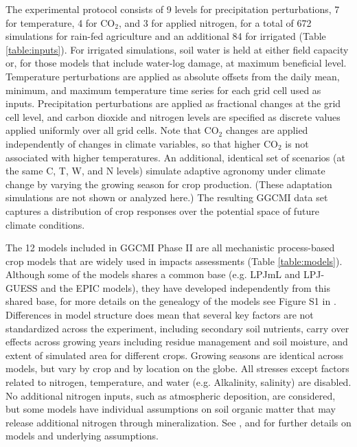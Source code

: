 \documentclass[preprint, 5p, times, twocolumn]{elsarticle}
\begin{document}
The experimental protocol consists of 9 levels for precipitation perturbations, 7 for temperature, 4 for CO$_2$, and 3 for applied nitrogen, for a total of 672 simulations for rain-fed agriculture and an additional 84 for irrigated (Table \ref{table:inputs}). For irrigated simulations, soil water is held at either field capacity or, for those models that include water-log damage, at maximum beneficial level.  Temperature perturbations are applied as absolute offsets from the daily mean, minimum, and maximum temperature time series for each grid cell used as inputs. Precipitation perturbations are applied as fractional changes at the grid cell level, and carbon dioxide and nitrogen levels are specified as discrete values applied uniformly over all grid cells. Note that CO$_2$ changes are applied independently of changes in climate variables, so that higher CO$_2$ is not associated with higher temperatures. An additional, identical set of scenarios (at the same C, T, W, and N levels) simulate adaptive agronomy under climate change by varying the growing season for crop production. (These adaptation simulations are not shown or analyzed here.) The resulting GGCMI data set captures a distribution of crop responses over the potential space of future climate conditions.

The 12 models included in GGCMI Phase II are all mechanistic process-based crop models that are widely used in impacts assessments (Table \ref{table:models}). Although some of the models shares a common base (e.g. LPJmL and LPJ-GUESS and the EPIC models), they have developed independently from this shared base, for more details on the genealogy of the models see Figure S1 in \citet{Rosenzweig2014}. Differences in model structure does mean that several key factors are not standardized across the experiment, including secondary soil nutrients, carry over effects across growing years including residue management and soil moisture, and extent of simulated area for different crops. Growing seasons are identical across models, but vary by crop and by location on the globe. All stresses except factors related to nitrogen, temperature, and water (e.g. Alkalinity, salinity) are disabled. No additional nitrogen inputs, such as atmospheric deposition, are considered, but some models have individual assumptions on soil organic matter that may release additional nitrogen through mineralization. See \citet{Rosenzweig2014}, \citet{Elliott2015} and \citet{muller_global_2017} for further details on models and underlying assumptions.
\end{document}
